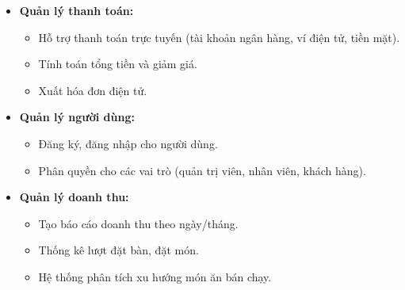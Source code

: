 \documentclass[a4paper]{article}
\begin{document}
\begin{itemize}
\item \textbf{Quản lý thanh toán:}
  \begin{itemize}
    \item Hỗ trợ thanh toán trực tuyến (tài khoản ngân hàng, ví điện tử, tiền mặt).
    \item Tính toán tổng tiền và giảm giá.
    \item Xuất hóa đơn điện tử.
  \end{itemize}
 
\item \textbf{Quản lý người dùng:}
  \begin{itemize}
    \item Đăng ký, đăng nhập cho người dùng.
    \item Phân quyền cho các vai trò (quản trị viên, nhân viên, khách hàng).
  \end{itemize}

\item \textbf{Quản lý doanh thu:}
  \begin{itemize}
    \item Tạo báo cáo doanh thu theo ngày/tháng.
    \item Thống kê lượt đặt bàn, đặt món.
    \item Hệ thống phân tích xu hướng món ăn bán chạy.
  \end{itemize}
\end{itemize}
\end{document}
